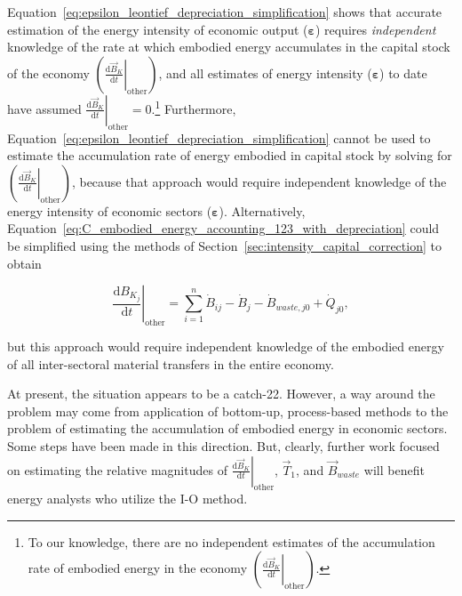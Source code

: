 Equation~\ref{eq:epsilon_leontief_depreciation_simplification} shows that 
accurate estimation of the energy intensity of economic output ($\boldsymbol{\varepsilon}$)
requires \emph{independent} knowledge of the rate 
at which embodied energy accumulates in the capital stock of the economy 
$\left( \left. \frac{\mathrm{d}\vec{B}_{K}}{\mathrm{d}t} \right|_{\mathrm{other}} \right)$,
and all estimates of energy intensity ($\boldsymbol{\varepsilon}$) to date have assumed 
$\left. \frac{\mathrm{d}\vec{B}_{K}}{\mathrm{d}t} \right|_{\mathrm{other}} = 0$.\footnote{To 
our knowledge, there are no independent estimates 
of the accumulation rate of embodied energy in the economy
$\left( \left. \frac{\mathrm{d}\vec{B}_{K}}{\mathrm{d}t} \right|_{\mathrm{other}} \right)$.}
Furthermore, Equation~\ref{eq:epsilon_leontief_depreciation_simplification} 
cannot be used to estimate the accumulation rate of energy embodied in 
capital stock by solving for 
$\left( \left. \frac{\mathrm{d}\vec{B}_{K}}{\mathrm{d}t} \right|_{\mathrm{other}} \right)$,
because that approach would require independent knowledge
of the energy intensity of economic sectors ($\boldsymbol{\varepsilon}$).
Alternatively, Equation~\ref{eq:C_embodied_energy_accounting_123_with_depreciation} 
could be simplified using the 
methods of Section~\ref{sec:intensity_capital_correction} to obtain

\begin{equation} \label{eq:C_embodied_energy_accounting_123_with_depreciation_simplified}
	\left. \frac{\mathrm{d}B_{K_{j}}}{\mathrm{d}t} \right|_{\mathrm{other}}
	= \sum\limits_{i=1}^n\dot{B}_{ij} 
	- \dot{B}_{j}
	- \dot{B}_{waste,j0}
	+ \dot{Q}_{j0},
\end{equation}

\noindent{}but this approach would require independent knowledge of the 
embodied energy of all inter-sectoral material transfers in the entire economy.

At present, the situation appears to be a catch-22. 
However, a way around the problem may come from application
of bottom-up, process-based methods to the problem 
of estimating the accumulation of embodied energy 
in economic sectors. 
Some steps have been made in this direction.\cite{brandt2013calculating}
But, clearly, further work focused on estimating the relative magnitudes of 
$\left. \frac{\mathrm{d}\vec{B}_{K}}{\mathrm{d}t} \right|_{\mathrm{other}}$,
$\vec{T}_{1}$, and $\vec{B}_{waste}$ 
will benefit energy analysts who utilize the I-O method.


